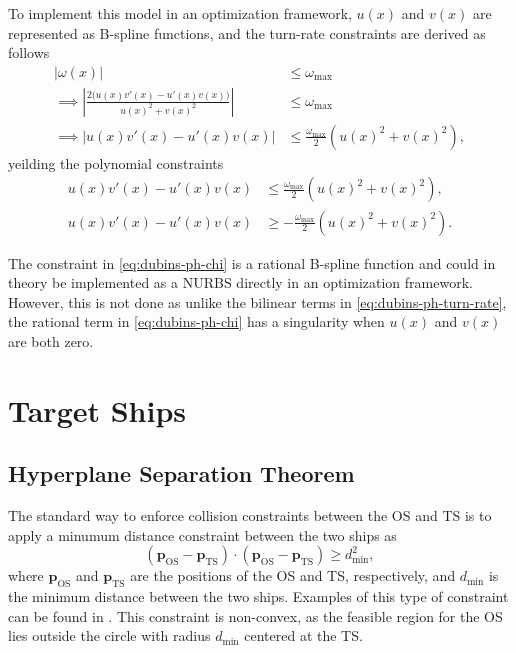 To implement this model in an optimization framework, $u(x)$ and $v(x)$ are represented as B-spline functions, and the turn-rate constraints are derived as follows
\begin{equation*}
    \begin{aligned}
        |\omega(x)| &\le \omega_{\max} \\
        \implies \left|\frac{2\big(u(x)v'(x) - u'(x)v(x)\big)}{u(x)^2 + v(x)^2}\right| &\le \omega_{\max} \\
        \implies \left|u(x)v'(x) - u'(x)v(x)\right| &\le \frac{\omega_{\max}}{2}\left(u(x)^2 + v(x)^2\right),
    \end{aligned}
\end{equation*}
yeilding the polynomial constraints
\begin{subequations}\label{eq:dubins-ph-turn-rate}
    \begin{align}
        u(x)v'(x) - u'(x)v(x) &\le \frac{\omega_{\max}}{2}\left(u(x)^2 + v(x)^2\right), \\
        u(x)v'(x) - u'(x)v(x) &\ge -\frac{\omega_{\max}}{2}\left(u(x)^2 + v(x)^2\right).
    \end{align}
\end{subequations}

The constraint in \cref{eq:dubins-ph-chi} is a rational B-spline function and could in theory be implemented as a NURBS directly in an optimization framework. However, this is not done as unlike the bilinear terms in \cref{eq:dubins-ph-turn-rate}, the rational term in \cref{eq:dubins-ph-chi} has a singularity when $u(x)$ and $v(x)$ are both zero.


\section{Target Ships}

\subsection{Hyperplane Separation Theorem}
The standard way to enforce collision constraints between the OS and TS is to apply a minumum distance constraint between the two ships as
\begin{equation}\label{eq:minimum-distance}
    (\mathbf p_{\text{OS}} - \mathbf p_{\text{TS}}) \cdot (\mathbf p_{\text{OS}} - \mathbf p_{\text{TS}}) \geq d_{\text{min}}^2,
\end{equation}
where $\mathbf p_{\text{OS}}$ and $\mathbf p_{\text{TS}}$ are the positions of the OS and TS, respectively, and $d_{\text{min}}$ is the minimum distance between the two ships. Examples of this type of constraint can be found in \cite{Thyri2022-MPC}. This constraint is non-convex, as the feasible region for the OS lies outside the circle with radius $d_{\text{min}}$ centered at the TS.

